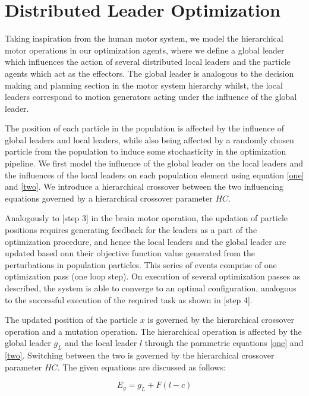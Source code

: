 \section{Distributed Leader Optimization}

Taking inspiration from the human motor system, we model the hierarchical motor operations in our optimization agents, where we define a global leader which influences the action of several distributed local leaders and the particle agents which act as the effectors. The global leader is analogous to the decision making and planning section in the motor system hierarchy whilst, the local leaders correspond to motion generators acting under the influence of the  global leader.

The position of each particle in the population is affected by the influence of global leaders and local leaders, while also being affected by a randomly chosen particle from the population to induce some stochasticity in the optimization pipeline. We first model the influence of the global leader on the local leaders and the influences of the local leaders  on each population element using equation \eqref{one} and \eqref{two}. We introduce a hierarchical crossover between the two influencing equations governed by a hierarchical crossover parameter $HC$.

Analogously to [step 3] in the brain motor operation, the updation of particle positions requires generating feedback for the leaders as a part of the optimization procedure, and hence the local leaders and the global leader are updated based onn their objective function value generated from the perturbations in population particles. This series of events comprise of one optimization pass (one loop step). On execution of several optimization passes as described, the system is able to converge to an optimal configuration, analogous to the successful execution of the required task as shown in [step 4].

The updated position of the particle $x$ is governed by the hierarchical crossover operation and a mutation operation. The hierarchical operation is affected by the global leader $g_L$ and the local leader $l$ through the parametric equations \eqref{one} and \eqref{two}. Switching between the two is governed by the hierarchical crossover parameter $HC$. The given equations are discussed as follows:

\begin{equation}
\label{one}
E_g = g_L + F (l - c)
\end{equation}

